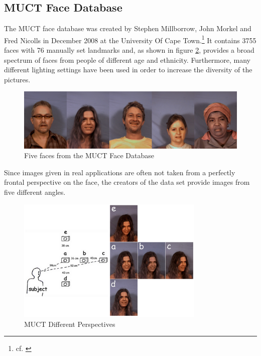 \documentclass[11pt, a4paper]{article}
\begin{document}
\subsection{MUCT Face Database}

The \acf{MUCT} face database was created by Stephen Millborrow, John Morkel and Fred Nicolls in December 2008 at the University Of Cape Town.\footnote{cf. \cite{muct}} It contains 3755 faces with 76 manually set landmarks and, as shown in figure \ref{fig:muctfaces}, provides a broad spectrum of faces from people of different age and ethnicity. Furthermore, many different lighting settings have been used in order to increase the diversity of the pictures.

\begin{figure}[htbp]
	\centering
	\includegraphics[width=\textwidth]{muct_faces.png}
	\caption{Five faces from the MUCT Face Database}
	\label{fig:muctfaces}
\end{figure}

Since images given in real applications are often not taken from a perfectly frontal perspective on the face, the creators of the data set provide images from five different angles.

\begin{figure}[htbp]
	\centering
	\includegraphics[width=0.8\textwidth]{muct_perspectives.png}
	\caption[MUCT Different Perspectives]{MUCT Different Perspectives\footnotemark}
	\label{fig:muctfaces}
\end{figure}
\end{document}
